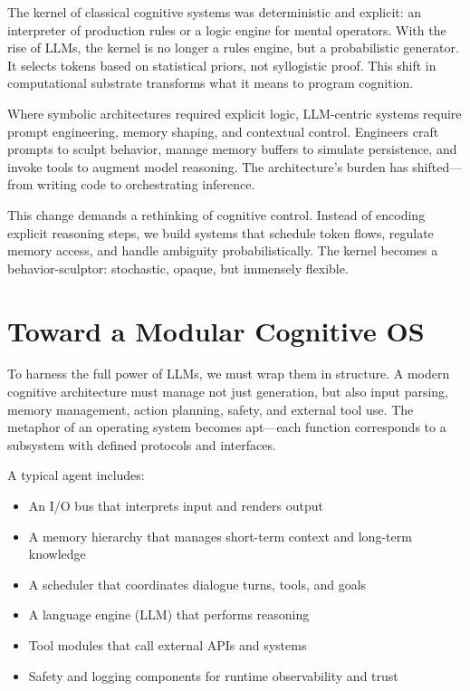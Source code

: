 \documentclass{book}
\begin{document}
The kernel of classical cognitive systems was deterministic and explicit: an interpreter of production rules or a logic engine for mental operators. With the rise of LLMs, the kernel is no longer a rules engine, but a probabilistic generator. It selects tokens based on statistical priors, not syllogistic proof. This shift in computational substrate transforms what it means to program cognition.

Where symbolic architectures required explicit logic, LLM-centric systems require prompt engineering, memory shaping, and contextual control. Engineers craft prompts to sculpt behavior, manage memory buffers to simulate persistence, and invoke tools to augment model reasoning. The architecture’s burden has shifted—from writing code to orchestrating inference.

This change demands a rethinking of cognitive control. Instead of encoding explicit reasoning steps, we build systems that schedule token flows, regulate memory access, and handle ambiguity probabilistically. The kernel becomes a behavior-sculptor: stochastic, opaque, but immensely flexible.

\section{Toward a Modular Cognitive OS}

To harness the full power of LLMs, we must wrap them in structure. A modern cognitive architecture must manage not just generation, but also input parsing, memory management, action planning, safety, and external tool use. The metaphor of an operating system becomes apt—each function corresponds to a subsystem with defined protocols and interfaces.

A typical agent includes:

\begin{itemize}
  \item An I/O bus that interprets input and renders output
  \item A memory hierarchy that manages short-term context and long-term knowledge
  \item A scheduler that coordinates dialogue turns, tools, and goals
  \item A language engine (LLM) that performs reasoning
  \item Tool modules that call external APIs and systems
  \item Safety and logging components for runtime observability and trust
\end{itemize}
\end{document}
